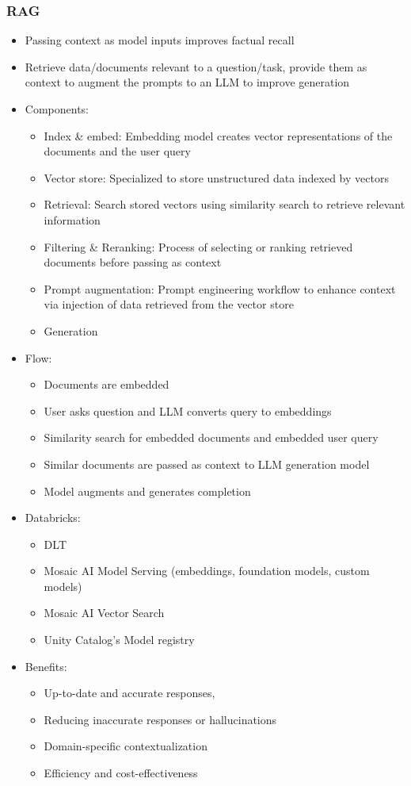 \documentclass[11pt]{scrartcl}
\begin{document}
\subsubsection*{RAG}
\begin{itemize}
	\item Passing context as model inputs improves factual recall
	\item Retrieve data/documents relevant to a question/task, provide them as context to augment the prompts to an LLM to improve generation
	\item Components:
	\begin{itemize}
		\item Index \& embed: Embedding model creates vector representations of the documents and the user query
		\item Vector store: Specialized to store unstructured data indexed by vectors
		\item Retrieval: Search stored vectors using similarity search to retrieve relevant information
		\item Filtering \& Reranking: Process of selecting or ranking retrieved documents before passing as context
		\item Prompt augmentation: Prompt engineering workflow to enhance context via injection of data retrieved from the vector store
		\item Generation
	\end{itemize}
	\item Flow: 
	\begin{itemize}
		\item Documents are embedded
		\item User asks question and LLM converts query to embeddings
		\item Similarity search for embedded documents and embedded user query
		\item Similar documents are passed as context to LLM generation model
		\item Model augments and generates completion
	\end{itemize}
	\item Databricks:
	\begin{itemize}
		\item DLT
		\item Mosaic AI Model Serving (embeddings, foundation models, custom models)
		\item Mosaic AI Vector Search
		\item Unity Catalog's Model registry
	\end{itemize}
	\item Benefits: 
	\begin{itemize}
		\item Up-to-date and accurate responses,
		\item Reducing inaccurate responses or hallucinations
		\item Domain-specific contextualization
		\item Efficiency and cost-effectiveness
	\end{itemize}
\end{itemize}
\end{document}
